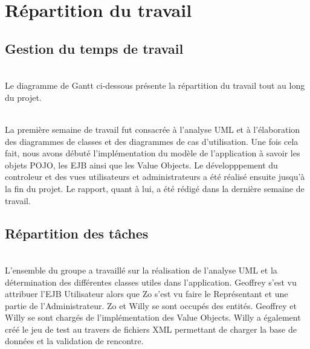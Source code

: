 \documentclass[10pt]{report}
\begin{document}
\newpage
\chapter{Répartition du travail}
\section{Gestion du temps de travail}
~\\
Le diagramme de Gantt ci-dessous présente la répartition du travail tout au long du projet. \\
	\begin{figure}[hp]
	      \begin{center}
	      \end{center}
	\end{figure}
\\

La première semaine de travail fut consacrée à l'analyse UML et à l'élaboration des diagrammes de classes et des diagrammes de cas d'utilisation. Une fois cela fait, nous avons débuté l'implémentation du modèle de l'application à savoir les objets POJO, les EJB ainsi que les Value Objects. Le développpement du controleur et des vues utilisateurs et administrateurs a été réalisé ensuite jusqu'à la fin du projet. Le rapport, quant à lui, a été rédigé dans la dernière semaine de travail.\\

\section{Répartition des tâches}
~\\

L'ensemble du groupe a travaillé sur la réalisation de l'analyse UML et la détermination des différentes classes utiles dans l'application.
Geoffrey s'est vu attribuer l'EJB Utilisateur alors que Zo s'est vu faire le Représentant et une partie de l'Administrateur.
Zo et Willy se sont occupés des entités.
Geoffrey et Willy se sont chargés de l'implémentation des Value Objects.
Willy a également créé le jeu de test au travers de fichiers XML permettant de charger la base de données et la validation de rencontre.
\end{document}

